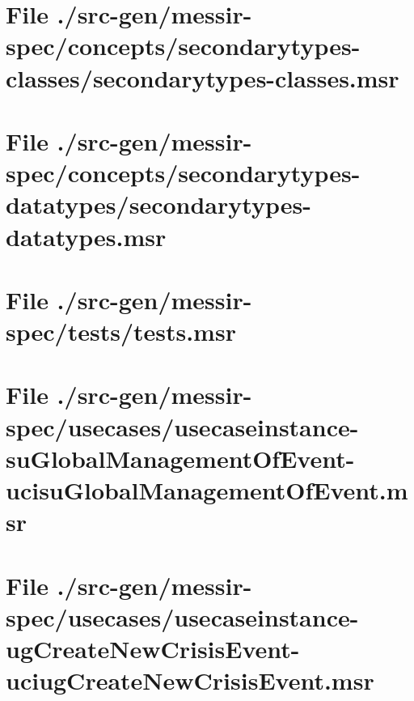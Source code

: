\section[File /src-gen/messir-spec/concepts.../secondarytypes-classes.msr]{File ./src-gen/messir-spec/concepts/secondarytypes-classes/secondarytypes-classes.msr}
\scriptsize

\normalsize
	
\section[File /src-gen/messir-spec/concepts.../secondarytypes-datatypes.msr]{File ./src-gen/messir-spec/concepts/secondarytypes-datatypes/secondarytypes-datatypes.msr}
\scriptsize

\normalsize
	
\section[File /src-gen/messir-spec/tests/tests.msr]{File ./src-gen/messir-spec/tests/tests.msr}
\scriptsize

\normalsize
	
\section[File /.../usecaseinstance-suGlobalManagementOfEvent-ucisuGlobalManagementOfEvent.msr]{File ./src-gen/messir-spec/usecases/usecaseinstance-suGlobalManagementOfEvent-ucisuGlobalManagementOfEvent.msr}
\scriptsize

\normalsize
	
\section[File /.../usecaseinstance-ugCreateNewCrisisEvent-uciugCreateNewCrisisEvent.msr]{File ./src-gen/messir-spec/usecases/usecaseinstance-ugCreateNewCrisisEvent-uciugCreateNewCrisisEvent.msr}
\scriptsize

\normalsize
	
